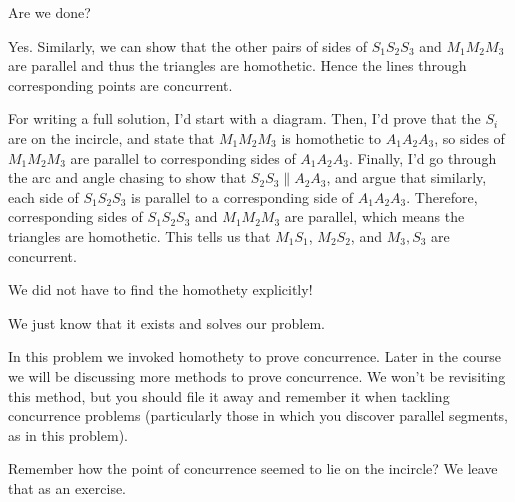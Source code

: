 Are we done?




Yes. Similarly, we can show that the other pairs of sides of $S_1S_2S_3$ and $M_1M_2M_3$ are parallel and thus the triangles are homothetic. Hence the lines through corresponding points are concurrent.

For writing a full solution, I'd start with a diagram. Then, I'd prove that the $S_i$ are on the incircle, and state that $M_1M_2M_3$ is homothetic to $A_1A_2A_3$, so sides of $M_1M_2M_3$ are parallel to corresponding sides of $A_1A_2A_3$. Finally, I'd go through the arc and angle chasing to show that $S_2S_3 \parallel A_2A_3$, and argue that similarly, each side of $S_1S_2S_3$ is parallel to a corresponding side of $A_1A_2A_3$. Therefore, corresponding sides of $S_1S_2S_3$ and $M_1M_2M_3$ are parallel, which means the triangles are homothetic. This tells us that $M_1S_1$, $M_2S_2$, and $M_3,S_3$ are concurrent.

We did not have to find the homothety explicitly! 

We just know that it exists and solves our problem.




In this problem we invoked homothety to prove concurrence. Later in the course we will be discussing more methods to prove concurrence. We won't be revisiting this method, but you should file it away and remember it when tackling concurrence problems (particularly those in which you discover parallel segments, as in this problem).

Remember how the point of concurrence seemed to lie on the incircle?  We leave that as an exercise.


